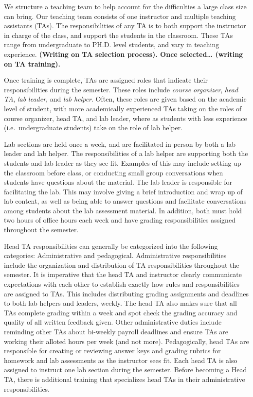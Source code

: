 \documentclass[
  12pt]{article}
\begin{document}
We structure a teaching team to help account for the difficulties a
large class size can bring. Our teaching team consists of one instructor
and multiple teaching assistants (TAs). The responsibilities of any TA
is to both support the instructor in charge of the class, and support
the students in the classroom. These TAs range from undergraduate to
PH.D. level students, and vary in teaching experience. \textbf{(Writing
on TA selection process). Once selected\ldots{} (writing on TA
training).}

Once training is complete, TAs are assigned roles that indicate their
responsibilities during the semester. These roles include \emph{course
organizer}, \emph{head TA}, \emph{lab leader}, and \emph{lab helper}.
Often, these roles are given based on the academic level of student,
with more academically experienced TAs taking on the roles of course
organizer, head TA, and lab leader, where as students with less
experience (i.e.~undergraduate students) take on the role of lab helper.

Lab sections are held once a week, and are facilitated in person by both
a lab leader and lab helper. The responsibilities of a lab helper are
supporting both the students and lab leader as they see fit. Examples of
this may include setting up the classroom before class, or conducting
small group conversations when students have questions about the
material. The lab leader is responsible for facilitating the lab. This
may involve giving a brief introduction and wrap up of lab content, as
well as being able to answer questions and facilitate conversations
among students about the lab assessment material. In addition, both must
hold two hours of office hours each week and have grading
responsibilities assigned throughout the semester.

Head TA responsibilities can generally be categorized into the following
categories: Administrative and pedagogical. Administrative
responsibilities include the organization and distribution of TA
responsibilities throughout the semester. It is imperative that the head
TA and instructor clearly communicate expectations with each other to
establish exactly how rules and responsibilities are assigned to TAs.
This includes distributing grading assignments and deadlines to both lab
helpers and leaders, weekly. The head TA also makes sure that all TAs
complete grading within a week and spot check the grading accuracy and
quality of all written feedback given. Other administrative duties
include reminding other TAs about bi-weekly payroll deadlines and ensure
TAs are working their alloted hours per week (and not more).
Pedagogically, head TAs are responsible for creating or reviewing answer
keys and grading rubrics for homework and lab assessments as the
instructor sees fit. Each head TA is also assigned to instruct one lab
section during the semester. Before becoming a Head TA, there is
additional training that specializes head TAs in their administrative
responsibilities.
\end{document}
